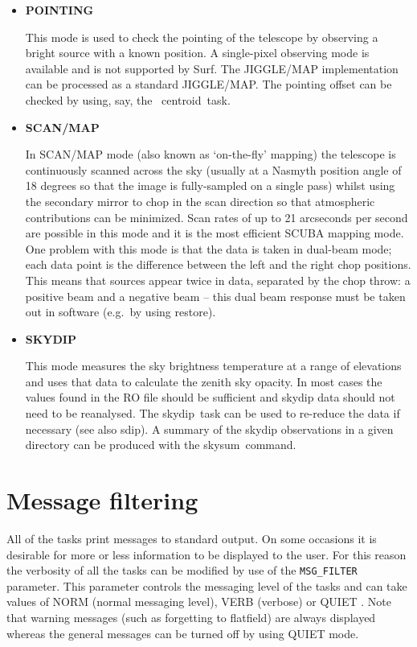 \documentclass[twoside,11pt]{article}
\newcommand{\scusoft}          {{\sc Surf}}
\newcommand{\Kappa}{\xref{{\sc{Kappa}}}{sun95}{}}
\newcommand{\task}[1]{{\sf #1}}
\newcommand{\param}[1]{{\tt #1}}
\newcommand{\skydip}{\htmlref{\task{skydip}}{SKYDIP}}
\newcommand{\skysum}{\htmlref{\task{skysum}}{SKYSUM}}
\newcommand{\restore}{\htmlref{\task{restore}}{RESTORE}}
\newcommand{\sdip}{\htmlref{\task{sdip}}{SDIP}}
\newcommand{\centroid}{\xref{\task{centroid}}{sun95}{CENTROID}}
\newcommand{\htmlref}[2]{#1}
\newcommand{\xref}[3]{#1}
\begin{document}
\begin{itemize}
\item {\bf POINTING}

This mode is used to check the pointing of the telescope by observing a bright
source with a known position. A single-pixel observing mode is available and
is not supported by \scusoft. The JIGGLE/MAP implementation can be processed
as a standard JIGGLE/MAP. The pointing offset can be checked by using, say,
the \Kappa\ \centroid\ task.

\item {\bf SCAN/MAP}

In SCAN/MAP mode (also known as `on-the-fly' mapping) the telescope is
continuously scanned across the sky (usually at a Nasmyth position angle of 18
degrees so that the image is fully-sampled on a single pass) whilst using the
secondary mirror to chop in the scan direction so that atmospheric 
contributions can be minimized. Scan rates of up to 21 arcseconds per second
are possible in this mode and it is the most efficient SCUBA mapping mode.
One problem with this mode is that the data is taken in dual-beam mode; each
data point is the difference between the left and the right chop positions.
This means that sources appear twice in data, separated by the chop throw:
a positive beam and a negative beam -- this dual beam response must
be taken out in software (e.g.\ by using \restore).

\item {\bf SKYDIP}

This mode measures the sky brightness temperature at a range of elevations and
uses that data to calculate the zenith sky opacity. In most cases the values
found in the RO file should be sufficient and skydip data should not need to
be reanalysed.  The \skydip\ task can be used to re-reduce the data
if necessary (see also \sdip). A summary of the skydip observations in a given 
directory can be produced with the \skysum\ command.

\end{itemize}

\section{Message filtering}

All of the tasks print messages to standard output. On some occasions it
is desirable for more or less information to be displayed to the user.
For this reason the verbosity of all the tasks can be modified by use of 
the \param{MSG\_FILTER} parameter. This parameter controls the messaging
level of the tasks and can take values of NORM (normal messaging level),
VERB (verbose) or QUIET \cite{mers}. Note that warning messages (such 
as forgetting to flatfield) are always displayed whereas the general messages
can be turned off by using QUIET mode.
\end{document}

